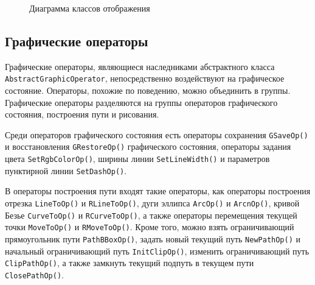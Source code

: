 \documentclass[14pt]{extarticle}
\begin{document}
\begin{figure} [h]
\caption{Диаграмма классов отображения}\label{pic_Frame}
\end{figure}

\pagebreak
\subsection{Графические операторы}
\sloppy

Графические операторы, являющиеся наследниками абстрактного класса \texttt{AbstractGraphicOperator}, непосредственно воздействуют на графическое состояние.
Операторы, похожие по поведению, можно объединить в группы. Графические операторы разделяются на группы операторов графического состояния, построения пути и рисования. 

Среди операторов графического состояния есть операторы сохранения \texttt{GSaveOp()} и восстановления \texttt{GRestoreOp()} графического состояния, операторы задания цвета \texttt{SetRgbColorOp()}, ширины линии \texttt{SetLineWidth()} и параметров пунктирной линии \texttt{SetDashOp()}.

В операторы построения пути входят такие операторы, как операторы построения отрезка \texttt{LineToOp()} и \texttt{RLineToOp()}, дуги эллипса \texttt{ArcOp()} и \texttt{ArcnOp()}, кривой Безье \texttt{CurveToOp()} и \texttt{RCurveToOp()}, а также операторы перемещения текущей точки \texttt{MoveToOp()} и \texttt{RMoveToOp()}. Кроме того, можно взять ограничивающий прямоугольник пути \texttt{PathBBoxOp()}, задать новый текущий путь \texttt{NewPathOp()} и начальный ограничивающий путь \texttt{InitClipOp()}, изменить ограничивающий путь \texttt{ClipPathOp()}, а также замкнуть текущий подпуть в текущем пути \texttt{ClosePathOp()}.
\end{document}
